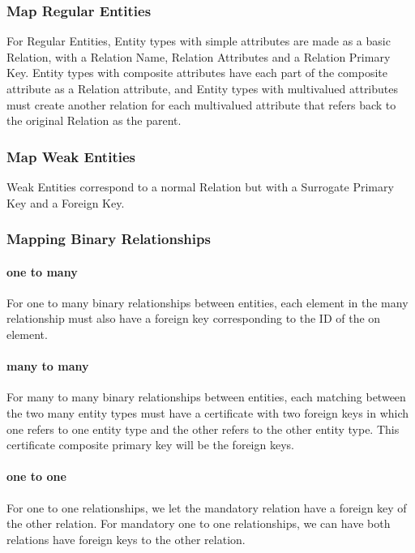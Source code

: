 \documentclass[12pt]{article}
\begin{document}
\subsubsection{Map Regular Entities}

For Regular Entities, Entity types with simple attributes are made as a basic Relation, with a Relation Name, Relation Attributes and a Relation Primary Key. Entity types with composite attributes have each part of the composite attribute as a Relation attribute, and Entity types with multivalued attributes must create another relation for each multivalued attribute that refers back to the original Relation as the parent.

\subsubsection{Map Weak Entities}

Weak Entities correspond to a normal Relation but with a Surrogate Primary Key and a Foreign Key.

\subsubsection{Mapping Binary Relationships}

\paragraph{one to many} For one to many binary relationships between entities, each element in the many relationship must also have a foreign key corresponding to the ID of the on element.

\paragraph{many to many} For many to many binary relationships between entities, each matching between the two many entity types must have a certificate with two foreign keys in which one refers to one entity type and the other refers to the other entity type. This certificate composite primary key will be the foreign keys.

\paragraph{one to one} For one to one relationships, we let the mandatory relation have a foreign key of the other relation. For mandatory one to one relationships, we can have both relations have foreign keys to the other relation.
\end{document}
